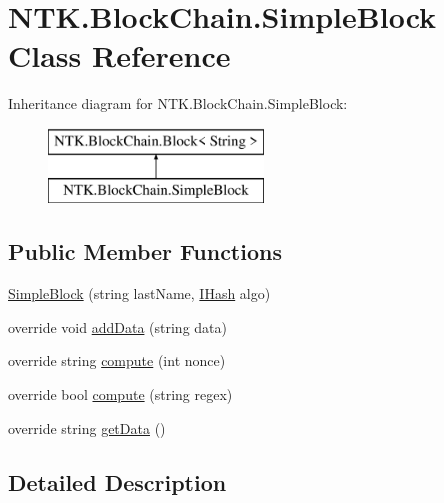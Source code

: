 \hypertarget{class_n_t_k_1_1_block_chain_1_1_simple_block}{}\section{N\+T\+K.\+Block\+Chain.\+Simple\+Block Class Reference}
\label{class_n_t_k_1_1_block_chain_1_1_simple_block}
Inheritance diagram for N\+T\+K.\+Block\+Chain.\+Simple\+Block\+:\begin{figure}[H]
\begin{center}
\leavevmode
\includegraphics[height=2.000000cm]{d0/d9b/class_n_t_k_1_1_block_chain_1_1_simple_block}
\end{center}
\end{figure}
\subsection*{Public Member Functions}
\begin{DoxyCompactItemize}
\item 
\mbox{\hyperlink{class_n_t_k_1_1_block_chain_1_1_simple_block_a65295f9c0c7b146f4a84b85f5fef93f5}{Simple\+Block}} (string last\+Name, \mbox{\hyperlink{interface_n_t_k_1_1_security_1_1_i_hash}{I\+Hash}} algo)
\item 
override void \mbox{\hyperlink{class_n_t_k_1_1_block_chain_1_1_simple_block_a304b9158060f12176e866aef165d2fa3}{add\+Data}} (string data)
\item 
override string \mbox{\hyperlink{class_n_t_k_1_1_block_chain_1_1_simple_block_aa599898417786215cc2afcd9f4fc4dfe}{compute}} (int nonce)
\item 
override bool \mbox{\hyperlink{class_n_t_k_1_1_block_chain_1_1_simple_block_aca95cb66b9e2cfec0e61943a814704f7}{compute}} (string regex)
\item 
override string \mbox{\hyperlink{class_n_t_k_1_1_block_chain_1_1_simple_block_a733c9456735bd3a0fc50ee2a95ef657c}{get\+Data}} ()
\end{DoxyCompactItemize}


\subsection{Detailed Description}


